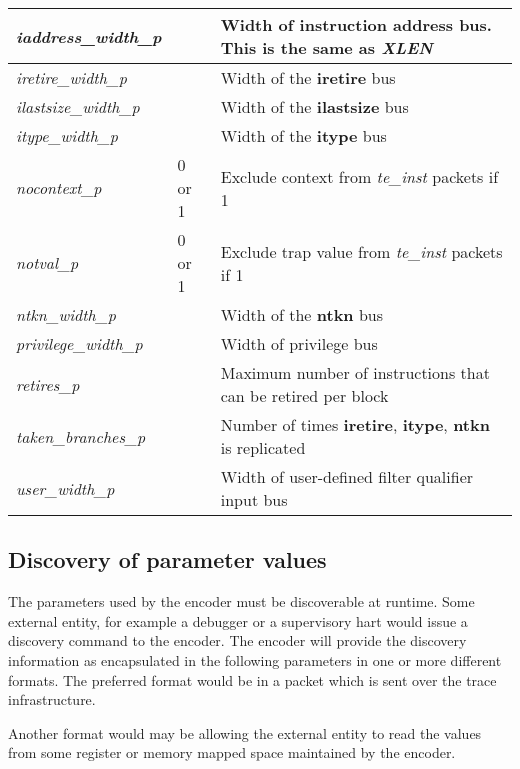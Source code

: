 \begin{table}[h]
\begin{tabulary}{\textwidth}{|l|p{25mm}|p{80mm}|}
        \hline
        \textit{iaddress\_width\_p} & & Width of instruction address bus. This is the same as \textit{XLEN}\\
        \hline
        \textit{iretire\_width\_p} & & Width of the \textbf{iretire} bus\\
        \hline
        \textit{ilastsize\_width\_p} & & Width of the \textbf{ilastsize} bus\\
        \hline
        \textit{itype\_width\_p} & & Width of the \textbf{itype} bus\\
        \hline
        \textit{nocontext\_p} & 0 or 1 & Exclude context from \textit{te\_inst} packets if 1 \\
        \hline
        \textit{notval\_p} & 0 or 1 & Exclude trap value from \textit{te\_inst} packets if 1 \\
        \hline
        \textit{ntkn\_width\_p} & & Width of the \textbf{ntkn} bus\\
        \hline
        \textit{privilege\_width\_p} & & Width of privilege bus \\
        \hline
        \textit{retires\_p} &  & Maximum number of instructions that can be retired per block \\
        \hline
        \textit{taken\_branches\_p} & & Number of times \textbf{iretire}, \textbf{itype}, \textbf{ntkn} is replicated\\
        \hline
        \textit{user\_width\_p} & & Width of user-defined filter qualifier input bus \\
        \hline
    \end{tabulary}
\end{table}
\FloatBarrier

\subsection {Discovery of parameter values}

The parameters used by the encoder must be discoverable at
runtime. Some external entity, for example a debugger or a supervisory
hart would issue a discovery command to the encoder. The encoder will
provide the discovery information as encapsulated in the following
parameters in one or more different formats.  The preferred format
would be in a packet which is sent over the trace infrastructure.

Another format would may be allowing the external entity to read the
values from some register or memory mapped space maintained by the
encoder.

